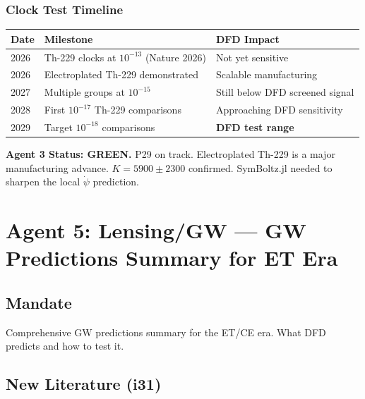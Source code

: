 \documentclass[11pt,a4paper]{article}
\newcommand{\GREEN}{\textcolor{dfdgreen}{\textbf{GREEN}}}
\begin{document}
\subsubsection{Clock Test Timeline}

\begin{center}
\begin{tabular}{lll}
\toprule
\textbf{Date} & \textbf{Milestone} & \textbf{DFD Impact} \\
\midrule
2026 & Th-229 clocks at $10^{-13}$ (Nature 2026) & Not yet sensitive \\
2026 & Electroplated Th-229 demonstrated & Scalable manufacturing \\
2027 & Multiple groups at $10^{-15}$ & Still below DFD screened signal \\
2028 & First $10^{-17}$ Th-229 comparisons & Approaching DFD sensitivity \\
2029 & Target $10^{-18}$ comparisons & \textbf{DFD test range} \\
\bottomrule
\end{tabular}
\end{center}

\textbf{Agent 3 Status: \GREEN.} P29 on track. Electroplated Th-229 is a major manufacturing advance. $K = 5900 \pm 2300$ confirmed. SymBoltz.jl needed to sharpen the local $\dot\psi$ prediction.

\section{Agent 5: Lensing/GW --- GW Predictions Summary for ET Era}

\subsection{Mandate}
Comprehensive GW predictions summary for the ET/CE era. What DFD predicts and how to test it.

\subsection{New Literature (i31)}
\end{document}
